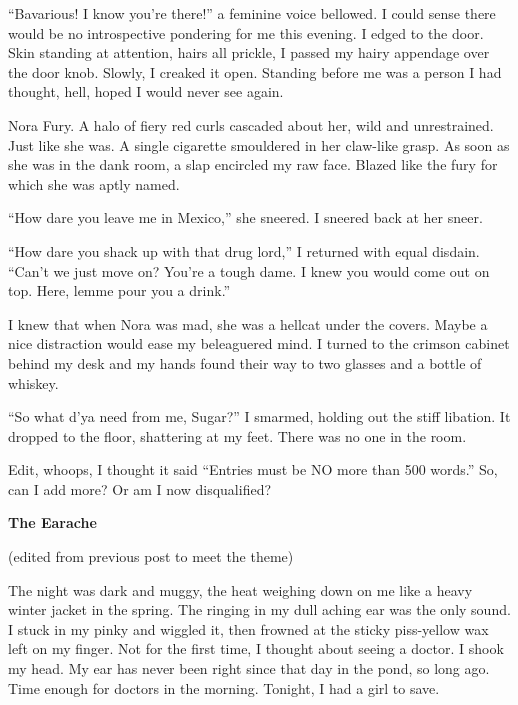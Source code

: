``Bavarious! I know you're there!'' a feminine voice bellowed. I
could sense there would be no introspective pondering for me this
evening. I edged to the door. Skin standing at attention, hairs all
prickle, I passed my hairy appendage over the door knob. Slowly, I
creaked it open. Standing before me was a person I had thought,
hell, hoped I would never see again.

Nora Fury. A halo of fiery red curls cascaded about her, wild and
unrestrained. Just like she was. A single cigarette smouldered in
her claw-like grasp. As soon as she was in the dank room, a slap
encircled my raw face. Blazed like the fury for which she was aptly
named.

``How dare you leave me in Mexico,'' she sneered. I sneered back at
her sneer.

``How dare you shack up with that drug lord,'' I returned with equal
disdain. ``Can't we just move on? You're a tough dame. I knew you
would come out on top. Here, lemme pour you a drink.''

I knew that when Nora was mad, she was a hellcat under the covers.
Maybe a nice distraction would ease my beleaguered mind. I turned
to the crimson cabinet behind my desk and my hands found their way
to two glasses and a bottle of whiskey.

``So what d'ya need from me, Sugar?'' I smarmed, holding out the
stiff libation. It dropped to the floor, shattering at my feet.
There was no one in the room.



Edit, whoops, I thought it said ``Entries must be NO more than 500
words.'' So, can I add more? Or am I now disqualified? 

 





 {\bf The Earache}

(edited from previous post to meet the theme)



The night was dark and muggy, the heat weighing down on me like a
heavy winter jacket in the spring. The ringing in my dull aching
ear was the only sound. I stuck in my pinky and wiggled it, then
frowned at the sticky piss-yellow wax left on my finger. Not for
the first time, I thought about seeing a doctor. I shook my head.
My ear has never been right since that day in the pond, so long
ago. Time enough for doctors in the morning. Tonight, I had a girl
to save.




